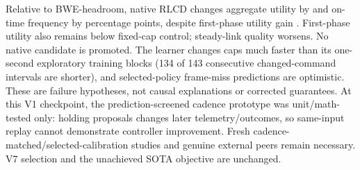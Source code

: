 \documentclass[10pt]{article}
\begin{document}
\begin{table}[ht]
\centering

\caption{Single-model native development means over six matched source/schedule templates. Generated content, same-host userspace transport and common native GCC/shadow-inference overhead limit scope; this is not held-out promotion or SOTA evidence.}
\label{tab:native-learned-development}
\end{table}

Relative to BWE-headroom, native RLCD changes aggregate utility by \NativeLiveBweUtilityDelta{} and on-time frequency by \NativeLiveBweOntimeDelta{} percentage points, despite first-phase utility gain \NativeLiveBweFirstPhaseDelta{}. First-phase utility also remains \NativeLiveFixedFirstPhaseDelta{} below fixed-cap control; steady-link quality worsens. No native candidate is promoted. The learner changes caps much faster than its one-second exploratory training blocks (134 of 143 consecutive changed-command intervals are shorter), and selected-policy frame-miss predictions are optimistic. These are failure hypotheses, not causal explanations or corrected guarantees. At this V1 checkpoint, the prediction-screened cadence prototype was unit/math-tested only: holding proposals changes later telemetry/outcomes, so same-input replay cannot demonstrate controller improvement. Fresh cadence-matched/selected-calibration studies and genuine external peers remain necessary. V7 selection and the unachieved SOTA objective are unchanged.
\end{document}
